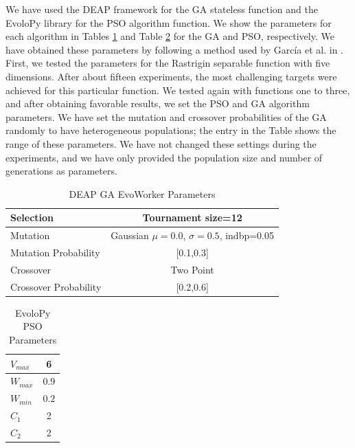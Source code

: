 \documentclass[runningheads]{llncs}
\begin{document}
We have used the DEAP framework for the
GA stateless function \cite{fortin2012deap} and the EvoloPy library
\cite{faris2016evolopy} for the PSO algorithm function. We show the parameters
for each algorithm in Tables \ref{tab:GAparams} and Table
\ref{tab:PSOparams} 
for the GA and PSO, respectively. We have obtained these parameters by following a
method used by García et al. in \cite{garcia2017benchmarking:anon}. First, we
tested the parameters for the Rastrigin separable function with five
dimensions. After about fifteen experiments, the most challenging targets were
achieved for this particular function. We tested again with functions one to
three, and after obtaining favorable results, we set the PSO and GA algorithm
parameters. We have set the mutation and crossover probabilities of the GA randomly
to have heterogeneous populations; the entry in the Table shows the range of these
parameters. We have not changed these settings during the experiments, and we have
only provided the population size and number of generations as parameters.

\begin{table}
  \small
  \caption{ DEAP GA EvoWorker Parameters }
  \label{tab:GAparams} 
  \centering
  \small
  \begin{tabular}{|l|c|}
    \hline
    Selection & Tournament size=12                            \\ \hline
    Mutation & Gaussian $\mu=0.0$, $\sigma=0.5$, indbp=0.05   \\ \hline
    Mutation Probability & [0.1,0.3]                          \\ \hline
    Crossover & Two Point                                     \\ \hline
    Crossover Probability  & [0.2,0.6]                        \\ \hline
  \end{tabular}
\end{table}

\begin{table}
  \small
  \caption{ EvoloPy PSO Parameters }
  \label{tab:PSOparams} 
  \centering
  \small
  \begin{tabular}{|l|c|}
    \hline
    $V_{max}$ & 6 \\ \hline
    $W_{max}$ & $0.9$ \\ \hline
    $W_{min}$ & $0.2$ \\ \hline
    $C_1$ & 2 \\ \hline
    $C_2$ & 2 \\ \hline
  \end{tabular}
\end{table}
\end{document}
